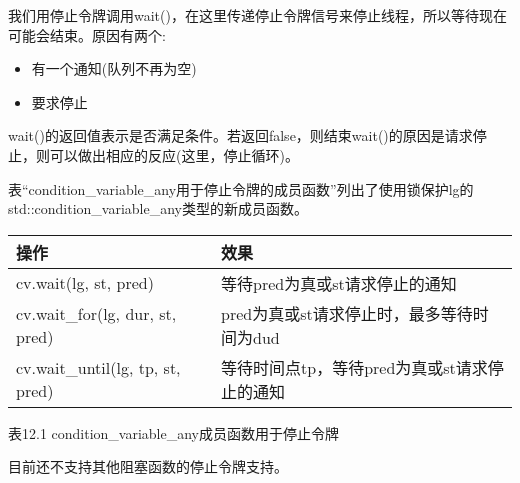 我们用停止令牌调用wait()，在这里传递停止令牌信号来停止线程，所以等待现在可能会结束。原因有两个:

\begin{itemize}
\item 
有一个通知(队列不再为空)

\item 
要求停止
\end{itemize}

wait()的返回值表示是否满足条件。若返回false，则结束wait()的原因是请求停止，则可以做出相应的反应(这里，停止循环)。

表“condition\_variable\_any用于停止令牌的成员函数”列出了使用锁保护lg的std::condition\_variable\_any类型的新成员函数。

\begin{longtable}[c]{|l|l|}
\hline
\textbf{操作} & \textbf{效果} \\ \hline
\endfirsthead
%
\endhead
%
cv.wait(lg, st, pred)            & 等待pred为真或st请求停止的通知                      \\ \hline
cv.wait\_for(lg, dur, st, pred)  & pred为真或st请求停止时，最多等待时间为dud \\ \hline
cv.wait\_until(lg, tp, st, pred) & 等待时间点tp，等待pred为真或st请求停止的通知   \\ \hline
\end{longtable}

\begin{center}
表12.1 condition\_variable\_any成员函数用于停止令牌
\end{center}

目前还不支持其他阻塞函数的停止令牌支持。






